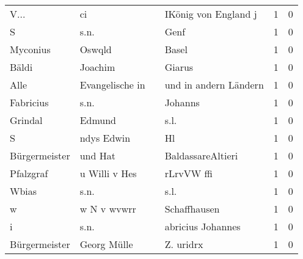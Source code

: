 \begin{center}
\begin{tiny}
\begin{longtabu}{llllrr}
                     V... &                                 ci &             &                        IKönig von England j &          1 &         0 \\
                        S &                               s.n. &             &                                        Genf &          1 &         0 \\
                 Myconius &                             Oswqld &             &                                       Basel &          1 &         0 \\
                    Bäldi &                            Joachim &             &                                      Giarus &          1 &         0 \\
                     Alle &                    Evangelische in &             &                       und in andern Ländern &          1 &         0 \\
                Fabricius &                               s.n. &             &                                     Johanns &          1 &         0 \\
                  Grindal &                             Edmund &             &                                        s.l. &          1 &         0 \\
                        S &                         ndys Edwin &             &                                          Hl &          1 &         0 \\
            Bürgermeister &                            und Hat &             &                           BaldassareAltieri &          1 &         0 \\
                Pfalzgraf &                      u Willi v Hes &             &                                  rLrvVW ffi &          1 &         0 \\
                    Wbias &                               s.n. &             &                                        s.l. &          1 &         0 \\
                        w &                        w N v wvwrr &             &                                Schaffhausen &          1 &         0 \\
                        i &                               s.n. &             &                           abricius Johannes &          1 &         0 \\
            Bürgermeister &                        Georg Mülle &             &                                   Z. uridrx &          1 &         0 \\

\end{longtabu}
\end{tiny}
\end{center}
